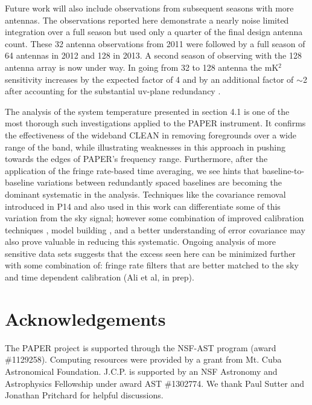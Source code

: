 \documentclass[preprint2]{aastex}
\begin{document}
Future work will also include observations from subsequent seasons with more antennas.  The observations reported here demonstrate a nearly noise limited integration over a full season but used only a quarter of the final design antenna count. These  32 antenna observations from 2011 were followed by a full season of 64 antennas in 2012 and 128 in 2013.  A second season of observing with the 128 antenna array is now under way. In going from  32 to 128 antenna the mK$^2$ sensitivity increases by the expected factor of 4 and by an additional factor of $\sim$2 after accounting for the substantial uv-plane redundancy \citep{Parsons:2012p9028}. 

The analysis of the system temperature presented in section 4.1 is one of the most thorough such investigations applied to the PAPER instrument.  It confirms the effectiveness of the wideband CLEAN in removing foregrounds over a wide range of the band, while illustrating weaknesses in this approach in pushing towards the edges of PAPER's frequency range.  Furthermore, after the application of the fringe rate-based time averaging, we see hints that baseline-to-baseline variations between redundantly spaced baselines are becoming the dominant systematic in the analysis.  Techniques like the covariance removal introduced in P14 and also used in this work can differentiate some of this variation from the sky signal; however some combination of improved calibration techniques \citep{Zheng:2014p10467}, model building \citep{Sullivan:2012p9457}, and a better understanding of error covariance  \citep{Liu:2011p8763} may also prove valuable in reducing this systematic. Ongoing analysis of more sensitive data sets suggests that the excess seen here can be minimized further with some combination of: fringe rate filters that are better matched to the sky and time dependent calibration (Ali et al, in prep).



\section{Acknowledgements}
The PAPER project is supported through the NSF-AST program (award \#1129258). Computing resources were provided by a grant from Mt. Cuba Astronomical Foundation.  J.C.P. is supported by an NSF Astronomy and Astrophysics Fellowship under award AST \#1302774.   We thank Paul Sutter and Jonathan Pritchard for helpful discussions.




\end{document}
